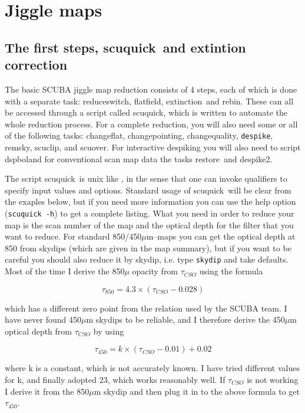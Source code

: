 \documentclass[twoside,11pt]{article}
\newcommand{\task}[1]{\textsf{#1}}
\newcommand{\rebin}{\xref{\task{rebin}}{sun216}{REBIN}}
\newcommand{\chgqual}{\xref{\task{change\_\-qua\-lity}}{sun216}{CHANGE_QUALITY}}
\newcommand{\chgflat}{\xref{\task{change\_flat}}{sun216}{CHANGE_FLAT}}
\newcommand{\chgpnt}{\xref{\task{change\_pointing}}{sun216}{CHANGE_POINTING}}
\newcommand{\desp}{\xref{\task{despike}}{sun216}{DESPIKE}}
\newcommand{\dspbol}{\xref{\task{dspbol}}{sun216}{DSPBOL}}
\newcommand{\resw}{\xref{\task{reduce\_switch}}{sun216}{REDUCE_SWITCH}}
\newcommand{\flatf}{\xref{\task{flatfield}}{sun216}{FLATFIELD}}
\newcommand{\skydip}{\xref{\task{skydip}}{sun216}{SKYDIP}}
\newcommand{\ext}{\xref{\task{extinction}}{sun216}{EXTINCTION}}
\newcommand{\scuquick}{\xref{\task{scuquick}}{sun216}{SCUQUICK}}
\newcommand{\remsky}{\xref{\task{remsky}}{sun216}{REMSKY}}
\newcommand{\scuover}{\xref{\task{scuover}}{sun216}{SCUOVER}}
\newcommand{\restore}{\xref{\task{restore}}{sun216}{RESTORE}}
\newcommand{\scuclip}{\xref{\task{scuclip}}{sun216}{SCUCLIP}}
\newcommand{\xref}[3]{#1}
\newcommand{\xlabel}[1]{}
\renewcommand{\_}{\texttt{\symbol{95}}}
\begin{document}
\section{\xlabel{Jiggle_maps}Jiggle maps}
\subsection{\xlabel{The_first_steps}The first steps, \scuquick\ and extintion correction}
The basic SCUBA jiggle map reduction consists of 4 steps, each of which
is done with a separate task: \resw, \flatf, \ext\ and \rebin. These
can all be accessed through a script called \scuquick, which is written
to automate the whole reduction process. For a complete reduction, you
will also need some or all of the following tasks: \chgflat, \chgpnt,
\chgqual, \texttt{despike},  \remsky, \scuclip, and \scuover. For interactive
despiking you will also need to script \dspbol and for conventional
scan map data the tasks \restore\ and \desp2.

The script \scuquick\ is unix like , in the sense that one can invoke
qualifiers to specify input values and options. Standard usage of
\scuquick\ will be clear from the exaples below, but if you need more
information you can use the help option (\texttt{scuquick -h}) to get a
complete listing.  What you need in order to reduce your map is the
scan number of the map and the optical depth for the filter that you
want to reduce. For standard 850/450$\mu$m--maps you can get the
optical depth at 850 from skydips (which are given in the map summary),
but if you want to be careful you should also reduce it by \skydip,
i.e. type \texttt{skydip} and take defaults. Most of the time I derive
the 850$\mu$ opacity from $\tau_{CSO}$ using the formula


\begin{equation}
\tau_{850} = 4.3 \times (\tau_{CSO} - 0.028)
\end{equation}

which has a different zero point from the relation used by the SCUBA
team.  I have never found 450$\mu$m skydips to be reliable, and I
therefore derive the 450$\mu$m optical depth from $\tau_{CSO}$ by using

\begin{equation}
\tau_{450} = k \times (\tau_{CSO} - 0.01) + 0.02
\end{equation}

where k is a constant, which is not accurately known. I have tried different  values for k, and finally adopted 23, which works reasonably well. If $\tau_{CSO}$ is not working I derive it from the 850$\mu$m skydip
and then plug it in to the above formula to get $\tau_{450}$.
\end{document}
